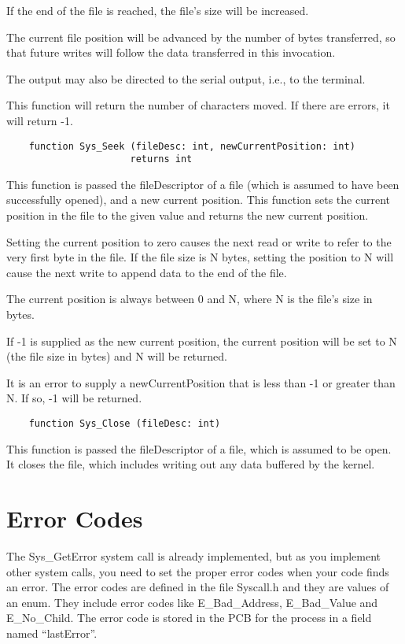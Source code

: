 \documentclass[12pt]{article}
\begin{document}
If the end of the file is reached, the file's size will be increased.

The current file position will be advanced by the number of bytes
transferred, so that future writes will follow the data transferred in
this invocation.

The output may also be directed to the serial output, i.e., to the terminal.

This function will return the number of characters moved.  If there
are errors, it will return -1.

\begin{verbatim}
    function Sys_Seek (fileDesc: int, newCurrentPosition: int) 
                      returns int
\end{verbatim}

This function is passed the fileDescriptor of a file (which is assumed
to have been successfully opened), and a new current position.  This
function sets the current position in the file to the given value and
returns the new current position.

Setting the current position to zero causes the next read or write to
refer to the very first byte in the file.  If the file size is N
bytes, setting the position to N will cause the next write to append
data to the end of the file.

The current position is always between 0 and N, where N is the file's
size in bytes.

If -1 is supplied as the new current position, the current position
will be set to N (the file size in bytes) and N will be returned.

It is an error to supply a newCurrentPosition that is less than -1 or
greater than N.  If so, -1 will be returned.

\begin{verbatim}
    function Sys_Close (fileDesc: int)
\end{verbatim}

This function is passed the fileDescriptor of a file, which is assumed
to be open.  It closes the file, which includes writing out any data
buffered by the kernel.

\section{Error Codes}

The Sys\_GetError system call is already implemented, but as you
implement other system calls, you need to set the proper error
codes when your code finds an error.   The error codes are defined
in the file Syscall.h and they are values of an enum.  They
include error codes like E\_Bad\_Address, E\_Bad\_Value and
E\_No\_Child.   The error code is stored in the PCB for the process
in a field named ``lastError''.
\end{document}
